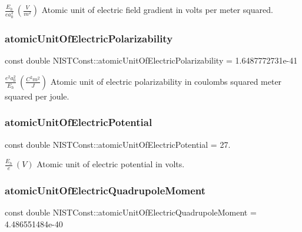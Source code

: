 $\frac{E_h}{e a_0^2}\ (\frac{V}{m^2})$ Atomic unit of electric field gradient in volts per meter squared. \mbox{\label{group___atomic_unit_ga5809393ec8d30cbb7e0c7a2f168e48ec}} 
\subsubsection{\texorpdfstring{atomic\+Unit\+Of\+Electric\+Polarizability}{atomicUnitOfElectricPolarizability}}
{\footnotesize\ttfamily const double N\+I\+S\+T\+Const\+::atomic\+Unit\+Of\+Electric\+Polarizability = 1.\+6487772731e-\/41}

$\frac{e^2 a_0^2}{E_h} \ (\frac{C^2 m^2}{J})$ Atomic unit of electric polarizability in coulombs squared meter squared per joule. \mbox{\label{group___atomic_unit_ga139c6486b1899658838d403380fc229a}} 
\subsubsection{\texorpdfstring{atomic\+Unit\+Of\+Electric\+Potential}{atomicUnitOfElectricPotential}}
{\footnotesize\ttfamily const double N\+I\+S\+T\+Const\+::atomic\+Unit\+Of\+Electric\+Potential = 27.}

$ \frac{E_h}{e}\ (V)$ Atomic unit of electric potential in volts. \mbox{\label{group___atomic_unit_gae7f2ec900567291168cdf7351248074d}} 
\subsubsection{\texorpdfstring{atomic\+Unit\+Of\+Electric\+Quadrupole\+Moment}{atomicUnitOfElectricQuadrupoleMoment}}
{\footnotesize\ttfamily const double N\+I\+S\+T\+Const\+::atomic\+Unit\+Of\+Electric\+Quadrupole\+Moment = 4.\+486551484e-\/40}

